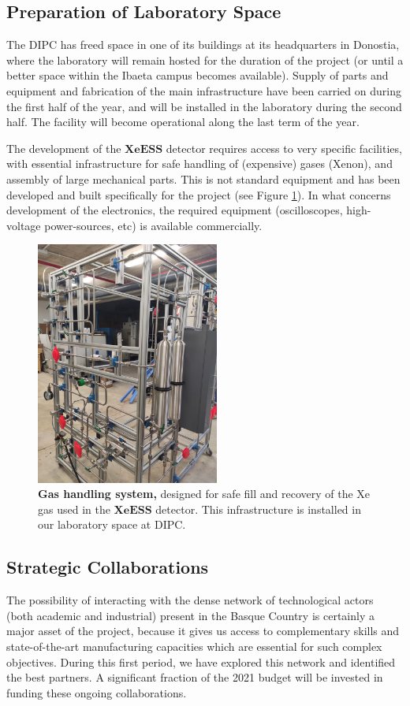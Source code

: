 \documentclass[12pt,a4paper,article]{report} %
\begin{document}
\subsection*{Preparation of Laboratory Space}
The DIPC has freed space in one of its buildings at its headquarters in Donostia, where the laboratory will remain hosted for the duration of the project (or until a better space within the Ibaeta campus becomes available). Supply of parts and equipment and fabrication of the main infrastructure have been carried on during the first half of the year, and will be installed in the laboratory during the second half. The facility will become operational along the last term of the year.

The development of the  $\mathbf{XeESS}$ detector requires access to very specific facilities, with essential infrastructure for safe handling of (expensive) gases (Xenon), and assembly of large mechanical parts. This is not standard equipment and has been developed and built specifically for the project (see Figure \ref{gascircuit}). In what concerns development of the electronics, the required equipment (oscilloscopes, high-voltage power-sources, etc) is available commercially.  

\begin{figure}[htbp]
\begin{center}
\includegraphics[width=6cm]{gascircuit}
\caption{\textbf{Gas handling system,} designed for safe fill and recovery of the Xe gas used in the $\mathbf{XeESS}$ detector. This infrastructure is installed in our laboratory space at DIPC.}
\label{gascircuit}
\end{center}
\end{figure}

\subsection*{Strategic Collaborations}
The possibility of interacting with the dense network of technological actors (both academic and industrial) present in the Basque Country is certainly a major asset of the project, because it gives us access to complementary skills and state-of-the-art manufacturing capacities which are essential for such complex objectives. During this first period, we have explored this network and identified the best partners.  A significant fraction of the 2021 budget will be invested in funding these ongoing collaborations. 
\end{document}
